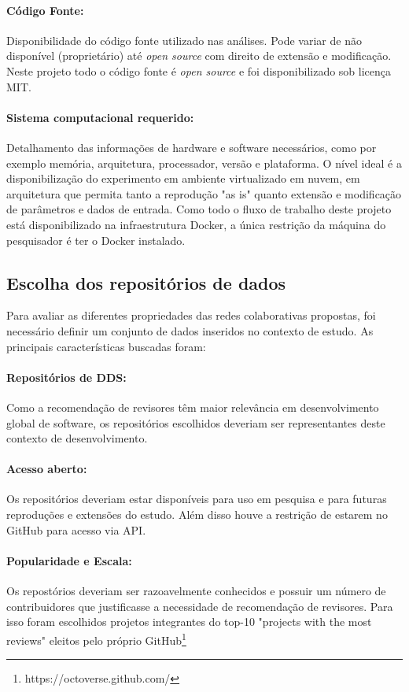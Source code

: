 \documentclass[peerreview]{acmart}
\begin{document}
\paragraph{Código Fonte:} Disponibilidade do código fonte utilizado nas análises. Pode variar de não disponível (proprietário) até \textit{open source} com direito de extensão e modificação. Neste projeto todo o código fonte é \textit{open source} e foi disponibilizado sob licença MIT.

\paragraph{Sistema computacional requerido:} Detalhamento das informações de hardware e software necessários, como por exemplo memória, arquitetura, processador, versão e plataforma. O nível ideal é a disponibilização do experimento em ambiente virtualizado em nuvem, em arquitetura que permita tanto a reprodução "as is" quanto extensão e modificação de parâmetros e dados de entrada. Como todo o fluxo de trabalho deste projeto está disponibilizado na infraestrutura Docker, a única restrição da máquina do pesquisador é ter o Docker instalado.

\subsection{Escolha dos repositórios de dados}

Para avaliar as diferentes propriedades das redes colaborativas propostas, foi necessário definir um conjunto de dados inseridos no contexto de estudo. As principais características buscadas foram:

\paragraph{Repositórios de DDS:} Como a recomendação de revisores têm maior relevância em desenvolvimento global de software, os repositórios escolhidos deveriam ser representantes deste contexto de desenvolvimento.

\paragraph{Acesso aberto: } Os repositórios deveriam estar disponíveis para uso em pesquisa e para futuras reproduções e extensões do estudo. Além disso houve a restrição de estarem no GitHub para acesso via API.

\paragraph{Popularidade e Escala:} Os repostórios deveriam ser razoavelmente conhecidos e possuir um número de contribuidores que justificasse a necessidade de recomendação de revisores. Para isso foram escolhidos projetos integrantes do top-10 "projects with the most reviews" eleitos pelo próprio GitHub\footnote{https://octoverse.github.com/}
\end{document}
